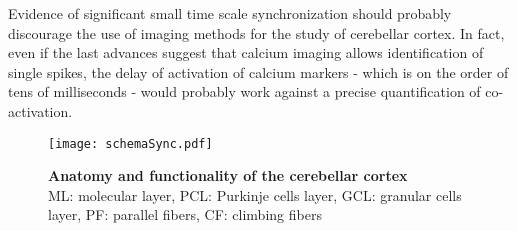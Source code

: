 Evidence of significant small time scale synchronization should probably discourage the use of imaging methods for the study of cerebellar cortex. In fact, even if the last advances suggest that calcium imaging allows identification of single spikes, the delay of activation of calcium markers - which is on the order of tens of milliseconds - would probably work against a precise quantification of co-activation.  

\begin{figure}[H]
  \centering
\texttt{[image: schemaSync.pdf]}
\caption{
\textbf{Anatomy and functionality of the cerebellar cortex}\\
ML: molecular layer, PCL: Purkinje cells layer, GCL: granular cells layer, PF: parallel fibers, CF: climbing fibers}
  \label{fig:clem}%
\end{figure}
